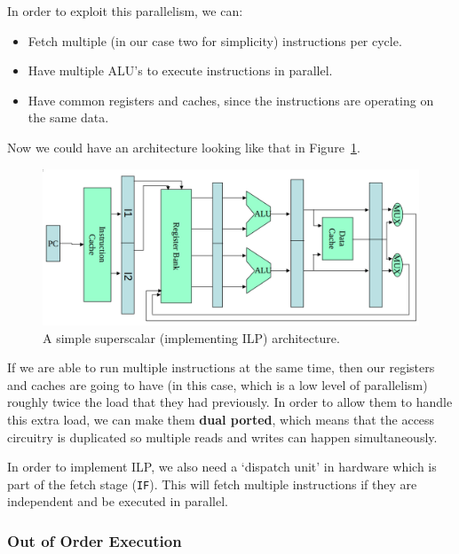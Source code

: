 In order to exploit this parallelism, we can:

\begin{itemize}
  \item Fetch multiple (in our case two for simplicity) instructions per cycle.
  \item Have multiple ALU's to execute instructions in parallel.
  \item Have common registers and caches, since the instructions are operating
  on the same data.
\end{itemize}

Now we could have an architecture looking like that in Figure~\ref{superscalar}.

\begin{figure}[ht]
  \centering
  \includegraphics[width=\textwidth]{images/superscalar}
  \caption{A simple superscalar (implementing ILP) architecture.}
  \label{superscalar}
\end{figure}


If we are able to run multiple instructions at the same time, then our registers
and caches are going to have (in this case, which is a low level of parallelism)
roughly twice the load that they had previously. In order to allow them to handle
this extra load, we can make them \textbf{dual ported}, which means that the
access circuitry is duplicated so multiple reads and writes can happen
simultaneously.

In order to implement ILP, we also need a `dispatch unit' in hardware which is
part of the fetch stage (\texttt{IF}). This will fetch multiple instructions if
they are independent and be executed in parallel.

\subsubsection{Out of Order Execution}

